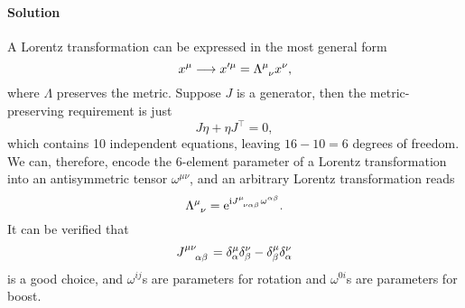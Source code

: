 \documentclass[hyperref, a4paper]{article}
\newcommand*{\ii}{\mathrm{i}}
\newcommand*{\ee}{\mathrm{e}}
\begin{document}
\paragraph{Solution} A Lorentz transformation can be expressed in the most general form
\begin{equation}
    x^\mu \longrightarrow x'^\mu = \Lambda\indices{^\mu_\nu} x^\nu,
\end{equation}
where $\Lambda$ preserves the metric. Suppose $J$ is a generator, then the metric-preserving requirement is just 
\begin{equation}
    J \eta + \eta J^\top = 0,
\end{equation}
which contains 10 independent equations, leaving $16-10=6$ degrees of freedom.
We can, therefore, encode the 6-element parameter of a Lorentz transformation into an antisymmetric tensor $\omega^{\mu \nu}$, and an arbitrary Lorentz transformation reads
\begin{equation}
    \Lambda\indices{^\mu_\nu} = \ee^{\ii J\indices{^\mu_\nu_\alpha_\beta} \omega^{\alpha \beta}}.
\end{equation}
It can be verified that 
\begin{equation}
    J\indices{^\mu^\nu_\alpha_\beta} = \delta^\mu_\alpha \delta^\nu_\beta - \delta^\mu_\beta \delta^\nu_\alpha
\end{equation}
is a good choice, and $\omega^{ij}$s are parameters for rotation and $\omega^{0i}$s are parameters for boost. 
\end{document}
